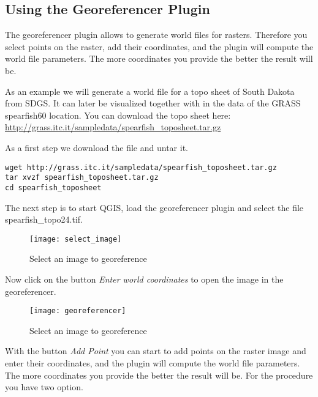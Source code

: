 \subsection{Using the Georeferencer Plugin}

The georeferencer plugin allows to generate world files for rasters. Therefore
you select points on the raster, add their coordinates, and the plugin will 
compute the world file parameters. The more coordinates you provide the better 
the result will be.

As an example we will generate a world file for a topo sheet of South Dakota 
from SDGS. It can later be visualized together with in the data of the GRASS 
spearfish60 location. You can download the topo sheet here: \\
\url{http://grass.itc.it/sampledata/spearfish\_toposheet.tar.gz}

As a first step we download the file and untar it.

\begin{verbatim}
wget http://grass.itc.it/sampledata/spearfish_toposheet.tar.gz
tar xvzf spearfish_toposheet.tar.gz
cd spearfish_toposheet
\end{verbatim}

The next step is to start QGIS, load the georeferencer plugin and select 
the file spearfish\_topo24.tif.

\begin{figure}[ht]
\begin{center}
  \caption{Select an image to georeference}\label{fig:select_image}\smallskip
  \texttt{[image: select\_image]}
\end{center}
\end{figure}

Now click on the button \textsl{Enter world coordinates} to open the image 
in the georeferencer.

\begin{figure}[ht]
\begin{center}
  \caption{Select an image to georeference}\label{fig:georeferencer}\smallskip
  \texttt{[image: georeferencer]}
\end{center}
\end{figure}

With the button \textsl{Add Point} you can start to add points on the 
raster image and enter their coordinates, and the plugin will compute the 
world file parameters. The more coordinates you provide the better the 
result will be. For the procedure you have two option. 

